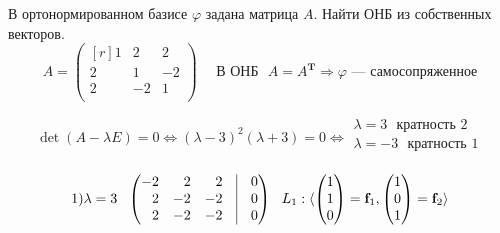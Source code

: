 \begin{prim}
	В ортонормированном базисе $\varphi$ задана матрица $A$. Найти ОНБ из собственных векторов.
$$
A=
\begin{pmatrix*}[r]
 1 & 2 & 2 \\
 2 & 1 & -2 \\
 2 & -2 & 1 \\
\end{pmatrix*}
 \:\:\:\:\:\:
\text{В ОНБ} \:\:\: A=A^{\textbf{T}}  \Rightarrow \varphi \text{ --- самосопряженное}
$$
\end{prim}
$$
\det (A-\lambda E)=0 \Leftrightarrow (\lambda-3)^2 (\lambda +3)=0  \Leftrightarrow
\left.
\begin{aligned}
\lambda=3 \:\:\:  \text{кратность 2}\\
\lambda=-3  \:\:\: \text{кратность 1}\\
\end{aligned}
\right.
$$

$$
1) \lambda=3 \:\:\: 
\begin{pmatrix*}[r]
 -2 & 2 & 2 & \vrule & 0\\
 2 & -2 & -2 & \vrule & 0\\
 2 & -2 & -2 & \vrule & 0\\
\end{pmatrix*}
\:\:\:  
L_1:
 \langle \left(
\begin{matrix*}[r]
1\\ 1\\ 0\\ 
\end{matrix*}
\right)=\textbf{f}_1,
\left(
\begin{matrix*}[r]
1\\ 0\\ 1\\ 
\end{matrix*}
\right)=\textbf{f}_2 \rangle
$$

